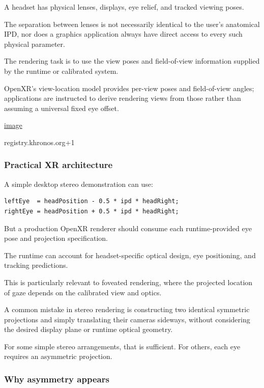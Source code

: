 A headset has physical lenses, displays, eye relief, and tracked viewing poses.

The separation between lenses is not necessarily identical to the user's anatomical IPD, nor does a graphics application always have direct access to every such physical parameter.

The rendering task is to use the view poses and field-of-view information supplied by the runtime or calibrated system.

OpenXR's view-location model provides per-view poses and field-of-view angles; applications are instructed to derive rendering views from those rather than assuming a universal fixed eye offset. 

\href{https://www.google.com/s2/favicons?domain=https://registry.khronos.org&sz=32}{image}

registry.khronos.org+1

\subsubsection{Practical XR architecture}\label{practical-xr-architecture}

A simple desktop stereo demonstration can use:

\begin{verbatim}
leftEye  = headPosition - 0.5 * ipd * headRight;
rightEye = headPosition + 0.5 * ipd * headRight;
\end{verbatim}

But a production OpenXR renderer should consume each runtime-provided eye pose and projection specification.

The runtime can account for headset-specific optical design, eye positioning, and tracking predictions.

This is particularly relevant to foveated rendering, where the projected location of gaze depends on the calibrated view and optics.

A common mistake in stereo rendering is constructing two identical symmetric projections and simply translating their cameras sideways, without considering the desired display plane or runtime optical geometry.

For some simple stereo arrangements, that is sufficient. For others, each eye requires an asymmetric projection.

\subsubsection{Why asymmetry appears}\label{why-asymmetry-appears}

